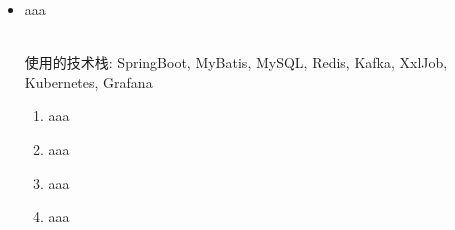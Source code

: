 \documentclass{resume}
\newcommand{\en}[1]{#1}
\newcommand{\zh}[1]{}
\begin{document}
\begin{itemize}
     \item \en{aaa}
           \zh{资源运营和资产管理方向，供应链+资产管理（包括RMS+CMP+电力管理）完成了公司资产的全生命周期管理，预算+预测+KAS账单作为平台支撑运行一套运营规则，在理解资源管理平台的基础上，根据新的需求在现有的业务上进行扩展，增添新的功能模块}
           \\使用的技术栈: SpringBoot, MyBatis, MySQL, Redis, Kafka, XxlJob, Kubernetes, Grafana
           \begin{enumerate}
                \item \en{aaa}
                      \zh{在2023年预算管理项目中，负责基础模块和平台大盘模块的关键研发工作。我的贡献支持了高效的预算收集与编制流程，显著提高公司财务规划的精确度和效率，缩短预算编制周期20\%。}
                \item  \en{aaa}
                      \zh{在2023年度预算执行中，我负责开发和测试预算转移、预算追加及预算月结等关键功能。这些功能的成功实施极大提高了预算执行的灵活性和精确度，减少了预算调整所需的时间，提升了预算追踪的效率}
                \item \en{aaa}
                      \zh{设计实现供应链到货大盘，优化交付追踪，显著提升资源交付效率}
                \item \en{aaa}
                      \zh{参与资产治理项目中使用python自动化脚本提升资源（如网卡）管理准确性，强化线上线下同步}\\
           \end{enumerate}

\end{itemize}
\end{document}
